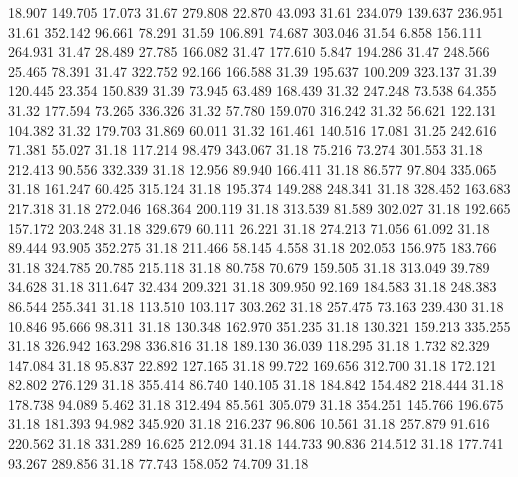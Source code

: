   18.907  149.705   17.073        31.67
 279.808   22.870   43.093        31.61
 234.079  139.637  236.951        31.61
 352.142   96.661   78.291        31.59
 106.891   74.687  303.046        31.54
   6.858  156.111  264.931        31.47
  28.489   27.785  166.082        31.47
 177.610    5.847  194.286        31.47
 248.566   25.465   78.391        31.47
 322.752   92.166  166.588        31.39
 195.637  100.209  323.137        31.39
 120.445   23.354  150.839        31.39
  73.945   63.489  168.439        31.32
 247.248   73.538   64.355        31.32
 177.594   73.265  336.326        31.32
  57.780  159.070  316.242        31.32
  56.621  122.131  104.382        31.32
 179.703   31.869   60.011        31.32
 161.461  140.516   17.081        31.25
 242.616   71.381   55.027        31.18
 117.214   98.479  343.067        31.18
  75.216   73.274  301.553        31.18
 212.413   90.556  332.339        31.18
  12.956   89.940  166.411        31.18
  86.577   97.804  335.065        31.18
 161.247   60.425  315.124        31.18
 195.374  149.288  248.341        31.18
 328.452  163.683  217.318        31.18
 272.046  168.364  200.119        31.18
 313.539   81.589  302.027        31.18
 192.665  157.172  203.248        31.18
 329.679   60.111   26.221        31.18
 274.213   71.056   61.092        31.18
  89.444   93.905  352.275        31.18
 211.466   58.145    4.558        31.18
 202.053  156.975  183.766        31.18
 324.785   20.785  215.118        31.18
  80.758   70.679  159.505        31.18
 313.049   39.789   34.628        31.18
 311.647   32.434  209.321        31.18
 309.950   92.169  184.583        31.18
 248.383   86.544  255.341        31.18
 113.510  103.117  303.262        31.18
 257.475   73.163  239.430        31.18
  10.846   95.666   98.311        31.18
 130.348  162.970  351.235        31.18
 130.321  159.213  335.255        31.18
 326.942  163.298  336.816        31.18
 189.130   36.039  118.295        31.18
   1.732   82.329  147.084        31.18
  95.837   22.892  127.165        31.18
  99.722  169.656  312.700        31.18
 172.121   82.802  276.129        31.18
 355.414   86.740  140.105        31.18
 184.842  154.482  218.444        31.18
 178.738   94.089    5.462        31.18
 312.494   85.561  305.079        31.18
 354.251  145.766  196.675        31.18
 181.393   94.982  345.920        31.18
 216.237   96.806   10.561        31.18
 257.879   91.616  220.562        31.18
 331.289   16.625  212.094        31.18
 144.733   90.836  214.512        31.18
 177.741   93.267  289.856        31.18
  77.743  158.052   74.709        31.18

